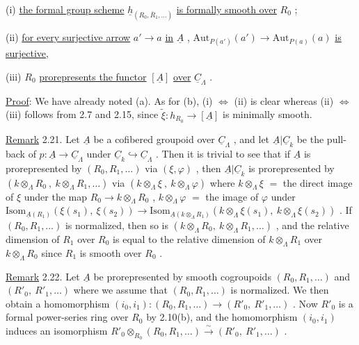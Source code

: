 (i)   \underline{the formal group scheme}  $\underline{h}_{(R_0,\bar{R}_1,\dots)}$  \underline{is formally smooth over}  $R_0$  ;

(ii)  \underline{for every surjective arrow}  $a' \to a$  \underline{in}  $\underline{A}$  ,
$\mathrm{Aut}_{P(a')}(a') \longrightarrow \mathrm{Aut}_{P(a)}(a)$  \underline{is surjective},

(iii)  $R_0$  \underline{prorepresents the functor}  $[\underline{A}]$  \underline{over}  $\underline{C}_\Lambda$  .



\underline{Proof}:  We have already noted (a). As for (b),  (i) $\Leftrightarrow$ (ii)  is clear whereas (ii) $\Leftrightarrow$ (iii)  follows from 2.7 and 2.15, since  $\tilde{\xi} : h_{R_0} \longrightarrow [\underline{A}]$  is minimally smooth.

\underline{Remark} 2.21.  Let  $\underline{A}$  be a cofibered groupoid over  $\underline{C}_\Lambda$  , and let  $\underline{A}|\underline{C}_k$  be the pull-back of  $p : \underline{A} \longrightarrow \underline{C}_\Lambda$  under  $\underline{C}_k \hookrightarrow \underline{C}_\Lambda$ . Then it is trivial to see that if  $\underline{A}$  is prorepresented by  $(R_0,R_1,\dots)$  via  $(\xi,\varphi)$  , then  $\underline{A}|\underline{C}_k$  is prorepresented by  $(k \otimes_\Lambda R_0\ ,\ k \otimes_\Lambda R_1,\dots)$  via  $(k \otimes_\Lambda \xi\ ,\ k \otimes_\Lambda \varphi)$  where  $k \otimes_\Lambda \xi$ $=$ the direct image of  $\xi$  under the map  $R_0 \longrightarrow k \otimes_\Lambda R_0$ ,  $k \otimes_\Lambda \varphi$ $=$ the image of  $\varphi$  under  $\mathrm{Isom}_{\underline{A}(R_1)}(\xi(s_1),\ \xi(s_2)) \longrightarrow \mathrm{Isom}_{\underline{A}(k \otimes_\Lambda R_1)}(k \otimes_\Lambda \xi(s_1),\ k \otimes_\Lambda \xi(s_2))$ . If  $(R_0,R_1,\dots)$  is normalized, then so is  $(k \otimes_\Lambda R_0,\ k \otimes_\Lambda R_1,\dots)$  , and the relative dimension of  $R_1$  over  $R_0$  is equal to the relative dimension of  $k \otimes_\Lambda R_1$  over  $k \otimes_\Lambda R_0$  since  $R_1$  is smooth over  $R_0$  .

\underline{Remark} 2.22.  Let  $\underline{A}$  be prorepresented by smooth cogroupoids  $(R_0,R_1,\dots)$  and  $(R'_0,\ R'_1,\dots)$  where we assume that  $(R_0,R_1,\dots)$  is normalized. We then obtain a homomorphism  $(i_0,i_1) : (R_0,R_1,\dots) \longrightarrow (R'_0,\ R'_1,\dots)$  . Now  $R'_0$  is a formal power-series ring over  $R_0$  by 2.10(b), and the homomorphism  $(i_0,i_1)$  induces an isomorphism  $R'_0 \otimes_{R_0} (R_0,R_1,\dots) \overset{\sim}{\longrightarrow} (R'_0,\ R'_1,\dots)$  .


